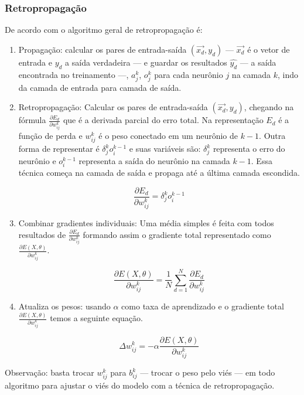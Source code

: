 \subsubsection*{Retropropagação}

De acordo com  o algoritmo geral de retropropagação é:

\begin{enumerate}
    \item Propagação: calcular os pares de entrada-saída $(\overrightarrow{x_d}, y_d)$ — $\overrightarrow{x_d}$ é o vetor de entrada e $y_d$ a saída verdadeira — e guardar os resultados $\hat{y_d}$ — a saída encontrada no treinamento —, $a_j^k$, $o_j^k$ para cada neurônio $j$ na camada $k$, indo da camada de entrada para camada de saída.
    
    \item Retropropagação: Calcular os pares de entrada-saída $(\overrightarrow{x_d}, y_d)$, chegando na fórmula $\frac{\partial{E_d}}{\partial{w_{ij}^k}}$ que é a derivada parcial do erro total. Na representação $E_d$ é a função de perda e $w_{ij}^k$ é o peso  conectado em um neurônio de $k - 1$. Outra forma de representar é $\delta_j^k o_i^{k - 1}$ e suas variáveis são: $\delta_j^k$ representa o erro do neurônio e $o_i^{k - 1}$ representa a saída do neurônio na camada $k -1$. Essa técnica começa na camada de saída e propaga até a última camada escondida.
    
    $$ \frac{\partial{E_d}}{\partial{w_{ij}^k}} = \delta_j^k o_i^{k - 1} $$
    
    \item Combinar gradientes individuais: Uma média simples é feita com todos resultados de $\frac{\partial{E_d}}{\partial{w_{ij}^k}}$ formando assim o gradiente total representado como $\frac{\partial{E(X, \theta)}}{\partial{w_{ij}^k}}$.
    
    $$ \frac{\partial{E(X,\theta)}}{\partial{w_{ij}^k}} = \frac{1}{N} \sum_{d=1}^{N} \frac{\partial{E_d}}{\partial{w_{ij}^k}} $$
    \item Atualiza os pesos: usando $\alpha$ como taxa de aprendizado e o gradiente total $\frac{\partial{E(X, \theta)}}{\partial{w_{ij}^k}}$ temos a seguinte equação.
    
    $$ \Delta w_{ij}^k = -\alpha \frac{\partial{E(X,\theta)}}{\partial{w_{ij}^k}} $$
\end{enumerate}

Observação: basta trocar $w_{ij}^k$ para $b_{ij}^k$ — trocar o peso pelo viés — em todo algoritmo para ajustar o viés do modelo com a técnica de retropropagação.
